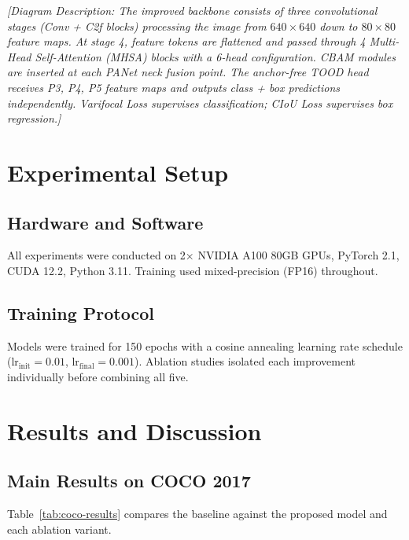 \documentclass[12pt, a4paper]{report}
\begin{document}
\textit{[Diagram Description: The improved backbone consists of three 
convolutional stages (Conv + C2f blocks) processing the image from 
$640\times640$ down to $80\times80$ feature maps. At stage 4, feature 
tokens are flattened and passed through 4 Multi-Head Self-Attention (MHSA) 
blocks with a 6-head configuration. CBAM modules are inserted at each 
PANet neck fusion point. The anchor-free TOOD head receives P3, P4, P5 
feature maps and outputs class + box predictions independently. Varifocal 
Loss supervises classification; CIoU Loss supervises box regression.]}

\chapter{Experimental Setup}
\label{chap:expsetup}

\section{Hardware and Software}
All experiments were conducted on 2× NVIDIA A100 80GB GPUs, PyTorch 2.1, 
CUDA 12.2, Python 3.11. Training used mixed-precision (FP16) throughout.

\section{Training Protocol}
Models were trained for 150 epochs with a cosine annealing learning rate 
schedule ($\text{lr}_{\text{init}} = 0.01$, $\text{lr}_{\text{final}} = 0.001$). 
Ablation studies isolated each improvement individually before combining all five.

\chapter{Results and Discussion}
\label{chap:results}

\section{Main Results on COCO 2017}

Table~\ref{tab:coco-results} compares the baseline against the proposed model 
and each ablation variant.
\end{document}
